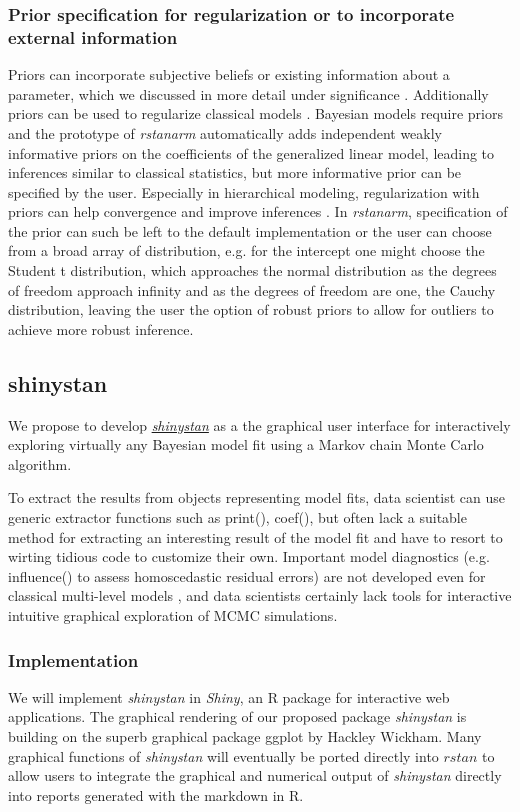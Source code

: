\documentclass[11pt,notitlepage]{article}
\begin{document}
\subsubsection*{Prior specification for regularization or to incorporate external information}

Priors can incorporate subjective beliefs or existing information about a parameter, which we discussed in more detail under significance \cite{carlin1997bayes}. Additionally priors can be used to regularize classical models \cite{gelman2008weakly}. Bayesian models require priors and the prototype of \textit{rstanarm} automatically adds independent weakly informative priors on the coefficients of the generalized linear model, leading to inferences similar to classical statistics,  but more informative prior can be specified by the user. Especially in hierarchical modeling, regularization with priors can help convergence and improve inferences \cite{Gelman-Hill_2014}. In \textit{rstanarm}, specification of the prior can such be left to the default implementation or the user can choose from a broad array of distribution, e.g. for the intercept one might choose the Student t distribution, which approaches the normal distribution as the degrees of freedom approach infinity and as the degrees of freedom are one, the Cauchy distribution, leaving the user the option of robust priors to allow for outliers to achieve more robust inference. 


\subsection*{shinystan}
We propose to develop \href{http://andrewgelman.com/2015/03/02/introducing-shinystan/}{\textit{shinystan}} as a the graphical user interface for interactively exploring virtually any Bayesian model fit using a Markov chain Monte Carlo algorithm. 

To extract the results from objects representing model fits, data scientist can use generic extractor functions such as print(), coef(), but often lack a suitable method for extracting an interesting result of the model fit and have to resort to wirting tidious code to customize their own. Important model diagnostics (e.g. influence() to assess  homoscedastic residual errors) are not developed even for classical multi-level models \cite{Galecki2013linear}, and data scientists certainly lack tools for interactive intuitive graphical exploration of MCMC simulations.

\subsubsection*{Implementation}
We will implement \textit{shinystan} in \textit{Shiny}, an R package for interactive web applications. The graphical rendering of our proposed package \textit{shinystan} is building on the superb graphical package ggplot by Hackley Wickham. Many graphical functions of \textit{shinystan} will eventually be ported directly into $rstan$ to allow users to integrate the graphical and numerical output of \textit{shinystan} directly into reports generated with the markdown in R.
\end{document}
